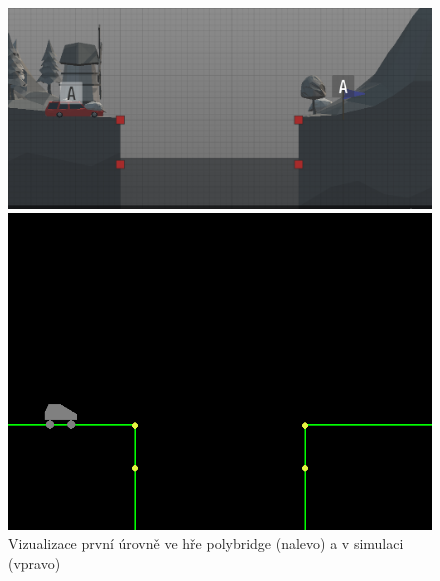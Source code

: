 
\begin{figure}[ht]
    \centering
    \begin{minipage}{0.49\textwidth}
        \centering
        \includegraphics[width=\linewidth]{img/poly_lvl1.png}
    \end{minipage}\hfill
    \begin{minipage}{0.49\textwidth}
        \centering
        \includegraphics[width=\linewidth]{img/impl_lvl1.png}
    \end{minipage}
    \caption{Vizualizace první úrovně ve hře polybridge (nalevo) a v simulaci (vpravo)}
    \label{fig:2}
\end{figure}

